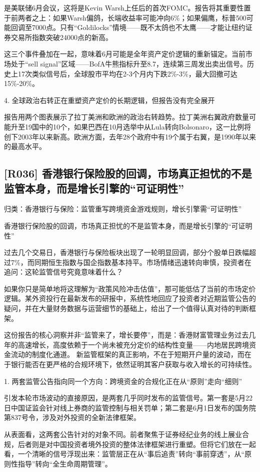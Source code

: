 \documentclass[11pt]{ctexart}
\begin{document}
是美联储6月会议，这将是Kevin Warsh上任后的首次FOMC。报告将其重要性置于前两者之上：如果Warsh偏鸽，长端收益率可能冲向6\%；如果偏鹰，标普500可能回调至7000点。只有“Goldilocks”情境——既不太鸽也不太鹰——才能让纽约证券交易所指数突破24000点的新高。

这三个事件叠加在一起，意味着6月可能是全年资产定价逻辑的重新锚定。当前市场处于“sell signal”区域——BofA牛熊指标升至8.7，连续第三周发出卖出信号。历史上17次类似信号后，全球股市平均在2-3个月内下跌2\%-3\%，最大回撤可达15\%-20\%。

4. 全球政治右转正在重塑资产定价的长期逻辑，但报告没有完全展开

报告用两个图表展示了拉丁美洲和欧洲的政治右转趋势。拉丁美洲右翼政府数量可能升至19国中的10个，如果巴西在10月选举中从Lula转向Bolsonaro，这一比例将创下2003年以来新高。欧洲方面，去年28个政府中有19个属于右翼，是1990年以来的最高水平。

\subsection{[R036] 香港银行保险股的回调，市场真正担忧的不是监管本身，而是增长引擎的“可证明性”}
{\small\color{refgray}归类：香港银行与保险：监管重写跨境资金游戏规则，增长引擎需“可证明性”}

香港银行保险股的回调，市场真正担忧的不是监管本身，而是增长引擎的“可证明性”

过去几个交易日，香港银行与保险板块出现了一轮明显回调，部分个股单日跌幅超过7\%，而同期恒生指数与国企指数基本持平。市场情绪迅速转向审慎，投资者在追问：这轮监管信号究竟意味着什么？

如果你只是简单地将这理解为“政策风险冲击估值”，那可能低估了当前的市场定价逻辑。某外资投行在最新发布的研报中，系统性地回应了投资者对近期监管公告的疑问，并在大量财务数据与运营细节的基础上，给出了一个值得认真对待的判断框架。

这份报告的核心洞察并非“监管来了，增长要停”，而是：香港财富管理业务过去几年的高速增长，高度依赖于一个尚未被充分定价的结构性变量——内地居民跨境资金流动的制度化通道。 新监管框架的真正影响，不在于短期开户量的波动，而在于银行能否在更严格的合规环境下，依然证明其客户获取与收入增长的可持续性。

1. 两套监管公告指向同一个方向：跨境资金的合规化正在从“原则”走向“细则”

引发本轮市场波动的直接原因，是两套几乎同时发布的监管信号。第一套是5月22日中国证监会针对线上券商的监管控制与相关罚单；第二套是6月1日发布的国务院第837号令，涉及对外投资的全新法律框架。

从表面看，这两套公告针对的对象不同。前者聚焦于证券经纪业务的线上展业合规，后者则是对中国投资者境外投资的整体法律框架进行重塑。但将它们放在一起看，一个清晰的信号浮现出来：监管层正在从“事后追责”转向“事前穿透”，从“原则性指导”转向“全生命周期管理”。
\end{document}
